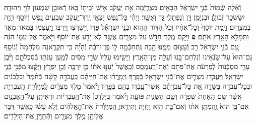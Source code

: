 \documentclass[twoside, openany, parskip=half, 11pt]{book}
\begin{document}
\begin{sometimes}
\begin{footnotesize}
\begin{multicols}{2}
\\
וְֿאֵ֗לֶּה שְֿׁמוֹת֙ בְּֿנֵ֣י יִשְׂרָאֵ֔ל הַבָּאִ֖ים מִצְרָ֑יְֿמָה אֵ֣ת יַֽעֲקֹ֔ב אִ֥ישׁ וּבֵית֖וֹ בָּֽאוּ׃ רְֿאוּבֵ֣ן שִׁמְע֔וֹן לֵוִ֖י וִֽיהוּדָֽה׃ יִשָּׂשׂכָ֥ר זְֿבוּלֻ֖ן וּבִנְיָמִֽן׃ דָּ֥ן וְֿנַפְתָּלִ֖י גָּ֥ד וְֿאָשֵֽׁר׃ וַיְהִ֗י כׇּל־נֶ֛פֶשׁ יֹֽצְֿאֵ֥י יֶֽרֶךְ־יַֽעֲקֹ֖ב שִׁבְעִ֣ים נָ֑פֶשׁ וְֿיוֹסֵ֖ף הָיָ֥ה בְֿמִצְרָֽיִם׃ וַיָּ֤מָת יוֹסֵף֙ וְֿכׇל־אֶחָ֔יו וְֿכֹ֖ל הַדּ֥וֹר הַהֽוּא׃ וּבְנֵ֣י יִשְׂרָאֵ֗ל פָּר֧וּ וַֽיִּשְׁרְֿצ֛וּ וַיִּרְבּ֥וּ וַיַּֽעַצְמ֖וּ בִּמְאֹ֣ד מְֿאֹ֑ד וַתִּמָּלֵ֥א הָאָ֖רֶץ אֹתָֽם׃ \textbf{פ}
וַיָּ֥קָם מֶֽלֶךְ־חָדָ֖שׁ עַל־מִצְרָ֑יִם אֲשֶׁ֥ר לֹֽא־יָדַ֖ע אֶת־יוֹסֵֽף׃ וַיֹּ֖אמֶר אֶל־עַמּ֑וֹ הִנֵּ֗ה עַ֚ם בְּֿנֵ֣י יִשְׂרָאֵ֔ל רַ֥ב וְֿעָצ֖וּם מִמֶּֽנּוּ׃ הָ֥בָה נִּֽתְחַכְּֿמָ֖ה ל֑וֹ פֶּן־יִרְבֶּ֗ה וְֿהָיָ֞ה כִּֽי־תִקְרֶ֤אנָה מִלְחָמָה֙ וְֿנוֹסַ֤ף גַּם־הוּא֙ עַל־שֹׂ֣נְֿאֵ֔ינוּ וְֿנִלְחַם־בָּ֖נוּ וְֿעָלָ֥ה מִן־הָאָֽרֶץ׃ וַיָּשִׂ֤ימוּ עָלָיו֙ שָׂרֵ֣י מִסִּ֔ים לְֿמַ֥עַן עַנֹּת֖וֹ בְּֿסִבְלֹתָ֑ם וַיִּ֜בֶן עָרֵ֤י מִסְכְּֿנוֹת֙ לְֿפַרְעֹ֔ה אֶת־פִּתֹ֖ם וְֿאֶת־רַֽעַמְסֵֽס׃ וְֿכַֽאֲשֶׁר֙ יְֿעַנּ֣וּ אֹת֔וֹ כֵּ֥ן יִרְבֶּ֖ה וְֿכֵ֣ן יִפְרֹ֑ץ וַיָּקֻ֕צוּ מִפְּֿנֵ֖י בְּֿנֵ֥י יִשְׂרָאֵֽל׃  וַיַּֽעֲבִ֧דוּ מִצְרַ֛יִם אֶת־בְּֿֿנֵ֥י יִשְׂרָאֵ֖ל בְּֿפָֽרֶךְ׃ וַיְמָֽרֲר֨וּ אֶת־חַיֵּיהֶ֜ם בַּֽעֲבֹדָ֣ה קָשָׁ֗ה בְּֿחֹ֨מֶר֙ וּבִלְבֵנִ֔ים וּבְכׇל־עֲבֹדָ֖ה בַּשָּׂדֶ֑ה אֵ֚ת כׇּל־עֲבֹ֣דָתָ֔ם אֲשֶׁר־עָֽבְֿד֥וּ בָהֶ֖ם בְּֿפָֽרֶךְ׃ וַיֹּ֨אמֶר֙ מֶ֣לֶךְ מִצְרַ֔יִם לַֽמְיַלְּֿדֹ֖ת הָֽעִבְרִיֹּ֑ת אֲשֶׁ֨ר שֵׁ֤ם הָֽאַחַת֙ שִׁפְרָ֔ה וְֿשֵׁ֥ם הַשֵּׁנִ֖ית פּוּעָֽה׃ וַיֹּ֗אמֶר בְּֿיַלֶּדְכֶן֙ אֶת־הָ֣עִבְרִיּ֔וֹת וּרְאִיתֶ֖ן עַל־הָֽאָבְֿנָ֑יִם אִם־בֵּ֥ן הוּא֙ וַֽהֲמִתֶּ֣ן אֹת֔וֹ וְֿאִם־בַּ֥ת הִ֖וא וָחָֽיָה׃ וַתִּירֶ֤אןָ הַֽמְיַלְּֿדֹת֙ אֶת־הָ֣אֱלֹהִ֔ים וְֿלֹ֣א עָשׂ֔וּ כַּֽאֲשֶׁ֛ר דִּבֶּ֥ר אֲלֵיהֶ֖ן מֶ֣לֶךְ מִצְרָ֑יִם וַתְּֿחַיֶּ֖יןָ אֶת־הַיְלָדִֽים׃


\end{multicols}
\end{footnotesize}
\end{sometimes}
\end{document}

